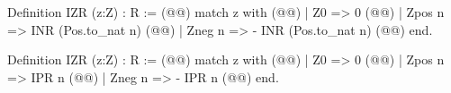 Definition IZR (z:Z) : R := (@\vspace{-0.05cm}@)
  match z with  (@\vspace{-0.05cm}@)
  | Z0 => 0 (@\vspace{-0.05cm}@)
  | Zpos n => INR (Pos.to_nat n) (@\vspace{-0.05cm}@)
  | Zneg n => - INR (Pos.to_nat n) (@\vspace{-0.05cm}@)
  end.

Definition IZR (z:Z) : R := (@\vspace{-0.05cm}@)
  match z with (@\vspace{-0.05cm}@)
  | Z0 => 0 (@\vspace{-0.05cm}@)
  | Zpos n => IPR n (@\vspace{-0.05cm}@)
  | Zneg n => - IPR n (@\vspace{-0.05cm}@)
  end.
